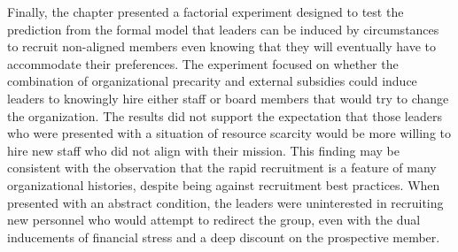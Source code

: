Finally, the chapter presented a factorial experiment designed to test the prediction from the formal model that leaders can be induced by circumstances to recruit non-aligned members even knowing that they will eventually have to accommodate their preferences. The experiment focused on whether the combination of organizational precarity and external subsidies could induce leaders to knowingly hire either staff or board members that would try to change the organization. The results did not support the expectation that those leaders who were presented with a situation of resource scarcity would be more willing to hire new staff who did not align with their mission. This finding may be consistent with the observation that the rapid recruitment is a feature of many organizational histories, despite being against recruitment best practices.  When presented with an abstract condition, the leaders were uninterested in recruiting new personnel who would attempt to redirect the group, even with the dual inducements of financial stress and a deep discount on the prospective member. 




